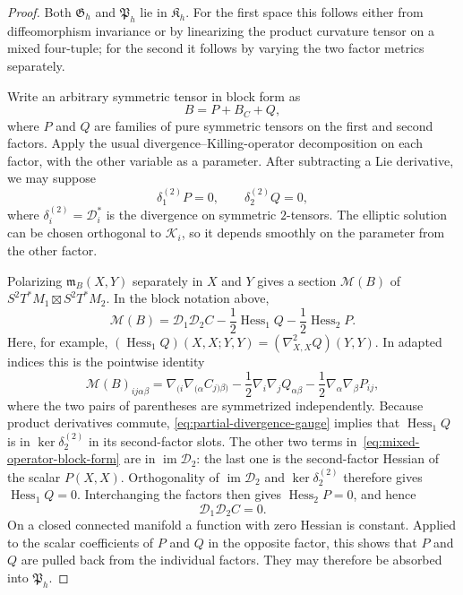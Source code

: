 \documentclass[11pt]{amsart}
\theoremstyle{definition}
\theoremstyle{remark}
\DeclareMathOperator{\Hess}{Hess}
\begin{document}
\begin{proof}
Both $\mathfrak G_h$ and $\mathfrak P_h$ lie in $\mathfrak K_h$.
For the first space this follows either from diffeomorphism invariance
or by linearizing the product curvature tensor on a mixed four-tuple;
for the second it follows by varying the two factor metrics separately.

Write an arbitrary symmetric tensor in block form as
\[
 B=P+B_C+Q,
\]
where $P$ and $Q$ are families of pure symmetric tensors on the first
and second factors.  Apply the usual divergence--Killing-operator
decomposition on each factor, with the other variable as a parameter.
After subtracting a Lie derivative, we may suppose
\begin{equation}\label{eq:partial-divergence-gauge}
 \delta_1^{(2)}P=0,
 \qquad
 \delta_2^{(2)}Q=0,
\end{equation}
where $\delta_i^{(2)}=\mathcal D_i^*$ is the divergence on symmetric
$2$-tensors.  The elliptic solution can be chosen orthogonal to
$\mathcal K_i$, so it depends smoothly on the parameter from the
other factor.

Polarizing $\mathfrak m_B(X,Y)$ separately in $X$ and $Y$ gives a
section $\mathcal M(B)$ of
$S^2T^*M_1\boxtimes S^2T^*M_2$.  In the block notation above,
\begin{equation}\label{eq:mixed-operator-block-form}
 \mathcal M(B)
 =\mathcal D_1\mathcal D_2C
  -\frac12\Hess_1Q-\frac12\Hess_2P.
\end{equation}
Here, for example,
$(\Hess_1Q)(X,X;Y,Y)=(\nabla^2_{X,X}Q)(Y,Y)$.
In adapted indices this is the pointwise identity
\[
 \mathcal M(B)_{ij\alpha\beta}
 =\nabla_{(i}\nabla_{(\alpha}C_{j)\beta)}
  -\frac12\nabla_i\nabla_jQ_{\alpha\beta}
  -\frac12\nabla_\alpha\nabla_\beta P_{ij},
\]
where the two pairs of parentheses are symmetrized independently.
Because product derivatives commute,
\eqref{eq:partial-divergence-gauge} implies that $\Hess_1Q$ is in
$\ker\delta_2^{(2)}$ in its second-factor slots.  The other two terms
in~\eqref{eq:mixed-operator-block-form} are in
$\operatorname{im}\mathcal D_2$: the last one is the second-factor
Hessian of the scalar $P(X,X)$.  Orthogonality of
$\operatorname{im}\mathcal D_2$ and $\ker\delta_2^{(2)}$ therefore
gives $\Hess_1Q=0$.  Interchanging the factors then gives
$\Hess_2P=0$, and hence
\begin{equation}\label{eq:pure-mixed-killing-equation}
 \mathcal D_1\mathcal D_2C=0.
\end{equation}
On a closed connected manifold a function with zero Hessian is
constant.  Applied to the scalar coefficients of $P$ and $Q$ in the
opposite factor, this shows that $P$ and $Q$ are pulled back from the
individual factors.  They may therefore be absorbed into
$\mathfrak P_h$.


\end{proof}
\end{document}
